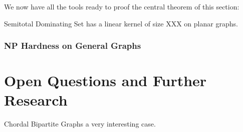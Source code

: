 We now have all the tools ready to proof the central theorem of this section: 

\begin{lemma}
    
\end{lemma}

\begin{theorem}
    Semitotal Dominating Set has a linear kernel of size XXX on planar graphs.
\end{theorem}
\subsection*{NP Hardness on General Graphs}

\chapter{Open Questions and Further Research}

Chordal Bipartite Graphs a very interesting case.